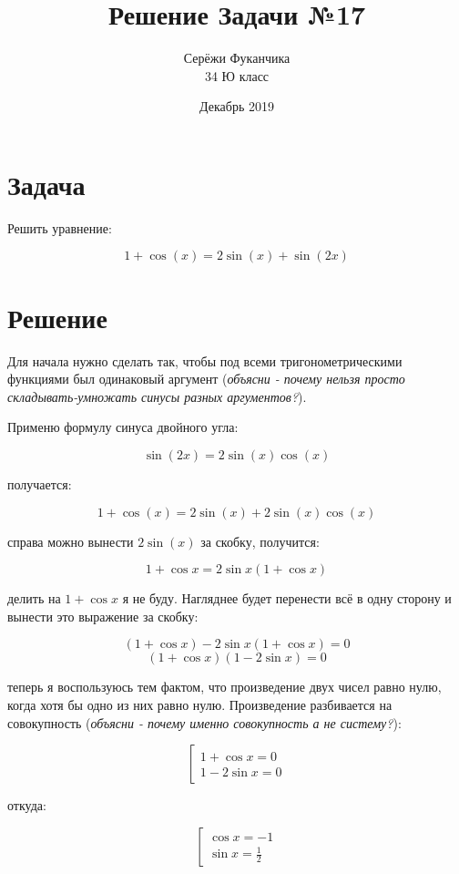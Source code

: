 \documentclass{article}
\title{Решение Задачи №17}
\author{Серёжи Фуканчика\\34 Ю класс}
\date{Декабрь 2019}
\begin{document}
\maketitle

\section{Задача}
Решить уравнение:

\begin{equation}\label{eqn:1}
    1+\cos(x)=2\sin(x)+\sin(2x)
\end{equation}

\section{Решение}
Для начала нужно сделать так, чтобы под всеми тригонометрическими функциями был одинаковый аргумент (\textit{объясни - почему нельзя просто складывать-умножать синусы разных аргументов?}).

Применю формулу синуса двойного угла:

$$\sin(2x)=2\sin(x)\cos(x)$$

получается:

$$1+\cos(x)=2\sin(x)+2\sin(x)\cos(x)$$

справа можно вынести $2\sin(x)$ за скобку, получится:

$$1+\cos{}x = 2\sin{}x(1+\cos{}x)$$

делить на $1+\cos{}x$ я не буду. Нагляднее будет перенести всё в одну сторону и вынести это выражение за скобку:

$$(1+\cos{}x)-2\sin{}x(1+\cos{}x)=0$$
$$(1+\cos{}x)(1-2\sin{}x)=0$$

теперь я воспользуюсь тем фактом, что произведение двух чисел равно нулю, когда хотя бы одно из них равно нулю. Произведение разбивается на совокупность (\textit{объясни - почему именно совокупность а не систему?}):

\begin{equation*}
\left[
\begin{array}{l}
1+\cos{}x  = 0 \\
1-2\sin{}x = 0
\end{array}
\right.
\end{equation*}

откуда:

\begin{equation*}
\left[
\begin{array}{l}
\cos{}x  = -1 \\
\sin{}x = \frac{1}{2}
\end{array}
\right.
\end{equation*}
\end{document}
